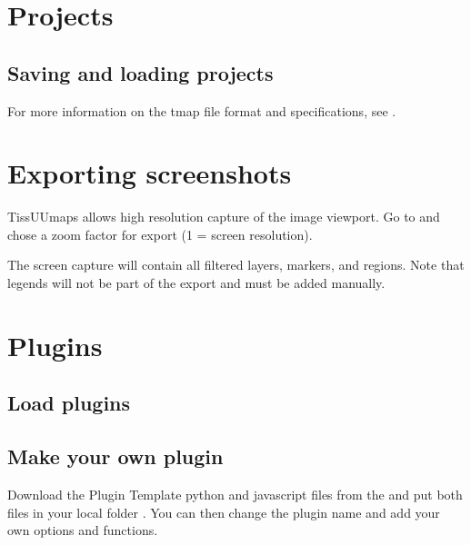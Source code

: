 \documentclass[letterpaper,10pt,english,openany,oneside]{sphinxmanual}
\begin{document}
\section{Projects}
\label{\detokenize{docs/starting/projects:projects}}\label{\detokenize{docs/starting/projects::doc}}

\subsection{Saving and loading projects}
\label{\detokenize{docs/starting/projects:saving-and-loading-projects}}


\sphinxAtStartPar
For more information on the tmap file format and specifications, see {\hyperref[\detokenize{docs/advanced/tmap:the-tmap-file-format}]{}}.

\sphinxstepscope


\section{Exporting screenshots}
\label{\detokenize{docs/starting/capture:exporting-screenshots}}\label{\detokenize{docs/starting/capture::doc}}
\sphinxAtStartPar
TissUUmaps allows high resolution capture of the image viewport. Go to  and chose a zoom factor for export (1 = screen resolution).

\sphinxAtStartPar
The screen capture will contain all filtered layers, markers, and regions. Note that legends will not be part of the export and must be added manually.

\sphinxstepscope


\section{Plugins}
\label{\detokenize{docs/starting/plugins:plugins}}\label{\detokenize{docs/starting/plugins::doc}}

\subsection{Load plugins}
\label{\detokenize{docs/starting/plugins:load-plugins}}

\subsection{Make your own plugin}
\label{\detokenize{docs/starting/plugins:make-your-own-plugin}}
\sphinxAtStartPar
Download the Plugin Template python and javascript files from the  and put both files in your local folder . You can then change the plugin name and add your own options and functions.
\end{document}
